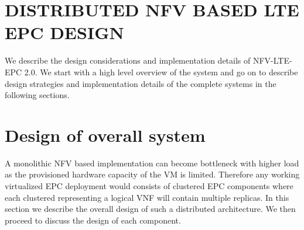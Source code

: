 \documentclass[hidelinks]{report}
\begin{document}
\section*{DISTRIBUTED NFV BASED LTE EPC DESIGN}

We describe the design considerations and implementation details of NFV-LTE-EPC 2.0. We start with a high level overview of the system and go on to describe design  strategies and implementation details of the complete systems in the following sections.
\section*{Design of overall system}

A monolithic NFV based implementation can become bottleneck with higher load as the provisioned hardware capacity of the VM is limited. Therefore any working virtualized EPC deployment would consists of clustered EPC components where each clustered representing a logical VNF will contain multiple replicas. In this section we describe the overall design of such a distributed architecture. We then proceed to discuss the design of each component. 
\end{document}
